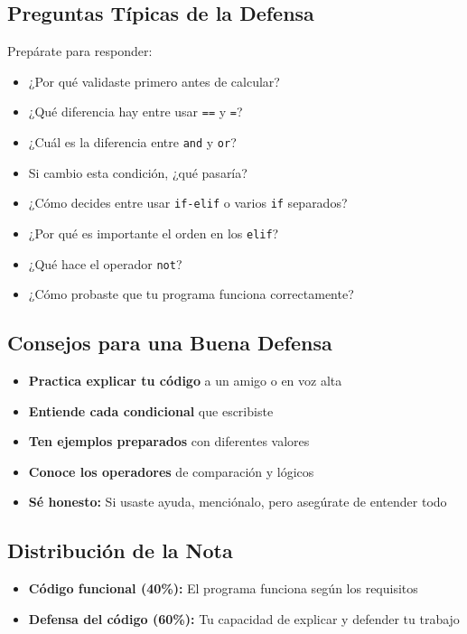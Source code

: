 \documentclass[12pt,a4paper]{article}
\begin{document}
\subsection{Preguntas Típicas de la Defensa}

Prepárate para responder:

\begin{itemize}[leftmargin=*]
    \item ¿Por qué validaste primero antes de calcular?
    \item ¿Qué diferencia hay entre usar \texttt{==} y \texttt{=}?
    \item ¿Cuál es la diferencia entre \texttt{and} y \texttt{or}?
    \item Si cambio esta condición, ¿qué pasaría?
    \item ¿Cómo decides entre usar \texttt{if-elif} o varios \texttt{if} separados?
    \item ¿Por qué es importante el orden en los \texttt{elif}?
    \item ¿Qué hace el operador \texttt{not}?
    \item ¿Cómo probaste que tu programa funciona correctamente?
\end{itemize}

\subsection{Consejos para una Buena Defensa}

\begin{itemize}[leftmargin=*]
    \item \textbf{Practica explicar tu código} a un amigo o en voz alta
    \item \textbf{Entiende cada condicional} que escribiste
    \item \textbf{Ten ejemplos preparados} con diferentes valores
    \item \textbf{Conoce los operadores} de comparación y lógicos
    \item \textbf{Sé honesto:} Si usaste ayuda, menciónalo, pero asegúrate de entender todo
\end{itemize}

\subsection{Distribución de la Nota}

\begin{itemize}
    \item \textbf{Código funcional (40\%):} El programa funciona según los requisitos
    \item \textbf{Defensa del código (60\%):} Tu capacidad de explicar y defender tu trabajo
\end{itemize}
\end{document}
